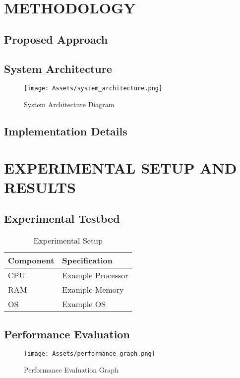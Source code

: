\documentclass{SOICTthesis}  %
\begin{document}
\chapter{METHODOLOGY}
\section{Proposed Approach}
\lipsum[22-24]
\cite{b9}

\section{System Architecture}
\begin{figure}[H]
    \centering
    \texttt{[image: Assets/system\_architecture.png]}  %
    \caption{System Architecture Diagram}
    \label{fig:system_architecture}
\end{figure}

\section{Implementation Details}
\lipsum[25-27]

\chapter{EXPERIMENTAL SETUP AND RESULTS}
\section{Experimental Testbed}
\lipsum[28-30]

\begin{table}[H]
\centering
\caption{Experimental Setup}
\begin{tabular}{|l|l|}
    \hline
    \textbf{Component} & \textbf{Specification} \\
    \hline
    CPU & Example Processor \\
    RAM & Example Memory \\
    OS  & Example OS \\
    \hline
\end{tabular}
\end{table}

\section{Performance Evaluation}
\lipsum[31-33]
\cite{b10, b11}

\begin{figure}[H]
    \centering
    \texttt{[image: Assets/performance\_graph.png]}  %
    \caption{Performance Evaluation Graph}
    \label{fig:performance_graph}
\end{figure}
\end{document}

